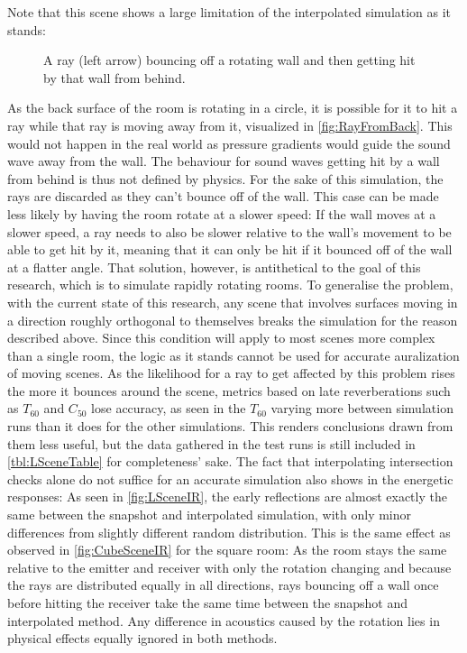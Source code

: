 Note that this scene shows a large limitation of the interpolated simulation as it stands:
\begin{figure}[t!]
    \begin{center}
        
    \end{center}
    \caption[Demonstration of a ray getting hit by a wall]{A ray (left arrow) bouncing off a rotating wall and then getting hit by that wall from behind.}\label{fig:RayFromBack}
\end{figure}
As the back surface of the room is rotating in a circle,
it is possible for it to hit a ray while that ray is moving away from it,
visualized in \autoref{fig:RayFromBack}.
This would not happen in the real world as pressure gradients would guide the sound wave away from the wall.
\newline
The behaviour for sound waves getting hit by a wall from behind is thus not defined by physics.
For the sake of this simulation, the rays are discarded as they can't bounce off of the wall.
This case can be made less likely by having the room rotate at a slower speed:
If the wall moves at a slower speed,
a ray needs to also be slower relative to the wall's movement to be able to get hit by it,
meaning that it can only be hit if it bounced off of the wall at a flatter angle.
That solution, however, is antithetical to the goal of this research, which is to simulate rapidly rotating rooms.
\newline
To generalise the problem, with the current state of this research,
any scene that involves surfaces moving in a direction roughly orthogonal to themselves breaks the simulation for the reason described above.
Since this condition will apply to most scenes more complex than a single room,
the logic as it stands cannot be used for accurate auralization of moving scenes.
\newline
As the likelihood for a ray to get affected by this problem rises the more it bounces around the scene,
metrics based on late reverberations such as \(T_{60}\) and \(C_{50}\) lose accuracy,
as seen in the \(T_{60}\) varying more between simulation runs than it does for the other simulations.
This renders conclusions drawn from them less useful,
but the data gathered in the test runs is still included in \autoref{tbl:LSceneTable} for completeness' sake.
\newline
The fact that interpolating intersection checks alone do not suffice for an accurate simulation also shows in the energetic responses:
As seen in \autoref{fig:LSceneIR}, the early reflections are almost exactly the same between the snapshot and interpolated simulation,
with only minor differences from slightly different random distribution.
This is the same effect as observed in \autoref{fig:CubeSceneIR} for the square room:
As the room stays the same relative to the emitter and receiver with only the rotation changing
and because the rays are distributed equally in all directions,
rays bouncing off a wall once before hitting the receiver take the same time between the snapshot and interpolated method.
Any difference in acoustics caused by the rotation lies in physical effects equally ignored in both methods.

